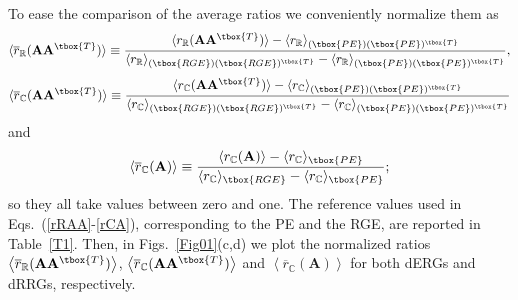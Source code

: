 To ease the comparison of the average ratios we conveniently normalize them as
\begin{equation}
    \langle \overline{r}_{\mathbb{R}}(\mathbf{A}\mathbf{A}^{\tbox{T}})\rangle \equiv \frac{\langle r_{\mathbb{R}}(\mathbf{A}\mathbf{A}^{\tbox{T}})\rangle -  \langle r_{\mathbb{R}}\rangle_{(\tbox{PE})(\tbox{PE})^{\tbox{T}}}}{ \langle r_{\mathbb{R}}\rangle_{(\tbox{RGE})(\tbox{RGE})^{\tbox{T}}}- \langle r_{\mathbb{R}}\rangle_{(\tbox{PE})(\tbox{PE})^{\tbox{T}}}},
    \label{rRAA}
\end{equation}
\begin{equation}
    \langle \overline{r}_{\mathbb{C}}(\mathbf{A}\mathbf{A}^{\tbox{T}})\rangle \equiv \frac{\langle r_{\mathbb{C}}(\mathbf{A}\mathbf{A}^{\tbox{T}})\rangle -  \langle r_{\mathbb{C}}\rangle_{(\tbox{PE})(\tbox{PE})^{\tbox{T}}}}{ \langle r_{\mathbb{C}}\rangle_{(\tbox{RGE})(\tbox{RGE})^{\tbox{T}}}- \langle r_{\mathbb{C}}\rangle_{(\tbox{PE})(\tbox{PE})^{\tbox{T}}}}
    \label{rCAA}
\end{equation}
and
\begin{equation}
    \langle \overline{r}_{\mathbb{C}}(\mathbf{A})\rangle \equiv \frac{\langle r_{\mathbb{C}}(\mathbf{A})\rangle -  \langle r_{\mathbb{C}}\rangle_{\tbox{PE}}}{ \langle r_{\mathbb{C}}\rangle_{\tbox{RGE}}- \langle r_{\mathbb{C}}\rangle_{\tbox{PE}}};
    \label{rCA}
\end{equation}
so they all take values between zero and one.
The reference values used in Eqs.~(\ref{rRAA}-\ref{rCA}), 
corresponding to the PE and the RGE, are reported in Table~\ref{T1}.
Then, in Figs.~\ref{Fig01}(c,d) we plot the normalized ratios 
$\left\langle \overline{r}_\mathbb{R}(\mathbf{A}\mathbf{A}^{\tbox{T}}) \right\rangle$,
$\left\langle \overline{r}_\mathbb{C}(\mathbf{A}\mathbf{A}^{\tbox{T}}) \right\rangle$ and 
$\left\langle \overline{r}_\mathbb{C}(\mathbf{A}) \right\rangle$
for both dERGs and dRRGs, respectively.

